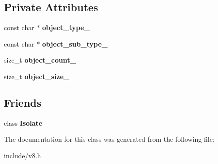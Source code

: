 \subsection*{Private Attributes}
\begin{DoxyCompactItemize}
\item 
const char $\ast$ {\bfseries object\+\_\+type\+\_\+}\hypertarget{classv8_1_1_heap_object_statistics_a990809fcfd32b55d2ad0aa4ec9452004}{}\label{classv8_1_1_heap_object_statistics_a990809fcfd32b55d2ad0aa4ec9452004}

\item 
const char $\ast$ {\bfseries object\+\_\+sub\+\_\+type\+\_\+}\hypertarget{classv8_1_1_heap_object_statistics_aa29ddbbedd1431276623fb6b12ef5945}{}\label{classv8_1_1_heap_object_statistics_aa29ddbbedd1431276623fb6b12ef5945}

\item 
size\+\_\+t {\bfseries object\+\_\+count\+\_\+}\hypertarget{classv8_1_1_heap_object_statistics_a7fc97890029c38eee4408acdc3013520}{}\label{classv8_1_1_heap_object_statistics_a7fc97890029c38eee4408acdc3013520}

\item 
size\+\_\+t {\bfseries object\+\_\+size\+\_\+}\hypertarget{classv8_1_1_heap_object_statistics_afe0db82334e2f2eb0e8d3a7932180534}{}\label{classv8_1_1_heap_object_statistics_afe0db82334e2f2eb0e8d3a7932180534}

\end{DoxyCompactItemize}
\subsection*{Friends}
\begin{DoxyCompactItemize}
\item 
class {\bfseries Isolate}\hypertarget{classv8_1_1_heap_object_statistics_aba4f0964bdacf2bbf62cf876e5d28d0a}{}\label{classv8_1_1_heap_object_statistics_aba4f0964bdacf2bbf62cf876e5d28d0a}

\end{DoxyCompactItemize}


The documentation for this class was generated from the following file\+:\begin{DoxyCompactItemize}
\item 
include/v8.\+h\end{DoxyCompactItemize}
